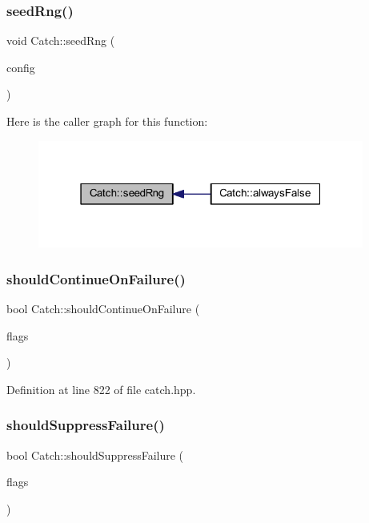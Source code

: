 \subsubsection{\texorpdfstring{seed\+Rng()}{seedRng()}}
{\footnotesize\ttfamily void Catch\+::seed\+Rng (\begin{DoxyParamCaption}\item[{I\+Config const \&}]{config }\end{DoxyParamCaption})}

Here is the caller graph for this function\+:\nopagebreak
\begin{figure}[H]
\begin{center}
\leavevmode
\includegraphics[width=304pt]{namespace_catch_a161400810eb0995394d6d8d3cae821ad_icgraph}
\end{center}
\end{figure}
\hypertarget{namespace_catch_a7f7480b15d74965459c844f0d393ed87}{}\label{namespace_catch_a7f7480b15d74965459c844f0d393ed87} 
\subsubsection{\texorpdfstring{should\+Continue\+On\+Failure()}{shouldContinueOnFailure()}}
{\footnotesize\ttfamily bool Catch\+::should\+Continue\+On\+Failure (\begin{DoxyParamCaption}\item[{int}]{flags }\end{DoxyParamCaption})\hspace{0.3cm}{\ttfamily [inline]}}



Definition at line 822 of file catch.\+hpp.

\hypertarget{namespace_catch_ab91eb13081203d634fe48d3d2ab386d7}{}\label{namespace_catch_ab91eb13081203d634fe48d3d2ab386d7} 
\subsubsection{\texorpdfstring{should\+Suppress\+Failure()}{shouldSuppressFailure()}}
{\footnotesize\ttfamily bool Catch\+::should\+Suppress\+Failure (\begin{DoxyParamCaption}\item[{int}]{flags }\end{DoxyParamCaption})\hspace{0.3cm}{\ttfamily [inline]}}



